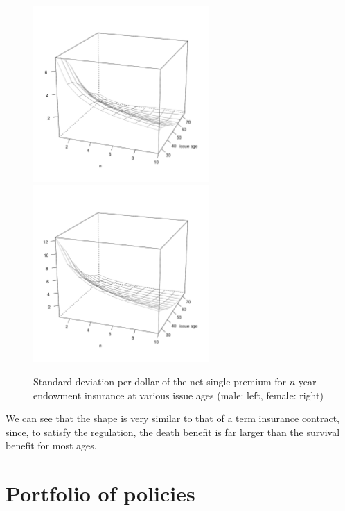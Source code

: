 \documentclass[12pt]{article}
\begin{document}
\begin{figure}[!htpb]
\begin{center}
\vspace{-15mm}
\centerline{
\includegraphics[width=0.6\textwidth]{images/endowSDPlotMale}
\includegraphics[width=0.6\textwidth]{images/endowSDPlotFemale}}
\end{center}
\vspace{-10mm}
\caption{Standard deviation per dollar of the net single premium for $n$-year endowment insurance at various issue ages (male: left, female: right)}
\label{fig:sdendow}
\end{figure}

We can see that the shape is very similar to that of a term insurance contract, since, to satisfy the regulation, the death benefit is far larger than the survival benefit for most ages.

\section{Portfolio of policies}
\end{document}
